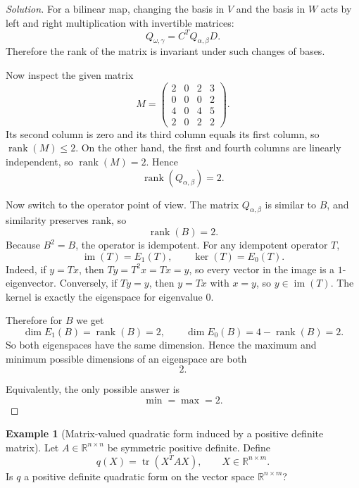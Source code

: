 \documentclass[11pt]{article}
\theoremstyle{definition}
\newtheorem{example}{Example}[section]
\newcommand{\R}{\mathbb{R}}
\newcommand{\rank}{\operatorname{rank}}
\newcommand{\trace}{\operatorname{tr}}
\begin{document}
\begin{proof}[Solution]
For a bilinear map, changing the basis in $V$ and the basis in $W$ acts by left and right multiplication with invertible matrices:
\[
Q_{\omega,\gamma}=C^T Q_{\alpha,\beta} D.
\]
Therefore the rank of the matrix is invariant under such changes of bases.

Now inspect the given matrix
\[
M=
\begin{pmatrix}
2&0&2&3\\
0&0&0&2\\
4&0&4&5\\
2&0&2&2
\end{pmatrix}.
\]
Its second column is zero and its third column equals its first column, so $\rank(M)\le 2$. On the other hand, the first and fourth columns are linearly independent, so $\rank(M)=2$. Hence
\[
\rank(Q_{\alpha,\beta})=2.
\]

Now switch to the operator point of view. The matrix $Q_{\alpha,\beta}$ is similar to $B$, and similarity preserves rank, so
\[
\rank(B)=2.
\]
Because $B^2=B$, the operator is idempotent. For any idempotent operator $T$,
\[
\operatorname{im}(T)=E_1(T), \qquad \ker(T)=E_0(T).
\]
Indeed, if $y=Tx$, then $Ty=T^2x=Tx=y$, so every vector in the image is a $1$-eigenvector. Conversely, if $Ty=y$, then $y=Tx$ with $x=y$, so $y\in \operatorname{im}(T)$. The kernel is exactly the eigenspace for eigenvalue $0$.

Therefore for $B$ we get
\[
\dim E_1(B)=\rank(B)=2,
\qquad
\dim E_0(B)=4-\rank(B)=2.
\]
So both eigenspaces have the same dimension. Hence the maximum and minimum possible dimensions of an eigenspace are both
\[
\boxed{2}.
\]

Equivalently, the only possible answer is
\[
\boxed{\min=\max=2}.
\]
\end{proof}

\begin{example}[Matrix-valued quadratic form induced by a positive definite matrix]
Let $A\in \R^{n\times n}$ be symmetric positive definite. Define
\[
q(X)=\trace(X^TAX), \qquad X\in \R^{n\times m}.
\]
Is $q$ a positive definite quadratic form on the vector space $\R^{n\times m}$?
\end{example}
\end{document}
